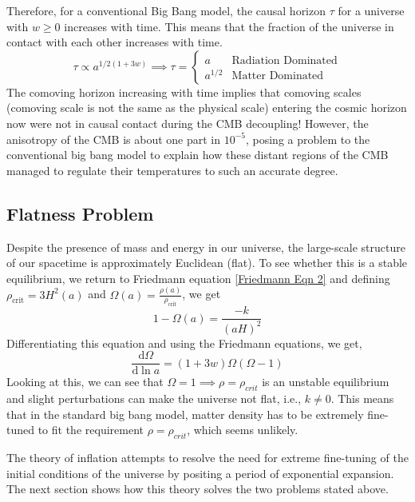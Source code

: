\documentclass[aps,prd,reprint,preprintnumbers,showpacs,floatfix,nofootinbib,superscript address]{revtex4-2}
\begin{document}
Therefore, for a conventional Big Bang model, the causal horizon $\tau$ for a universe with $w \geq 0$ increases with time. This means that the fraction of the universe in contact with each other increases with time.
\begin{equation}
    \tau \propto a^{1/2(1+3w)} \implies \tau = \begin{cases}
        a & \text{Radiation Dominated} \\
        a^{1/2} & \text{Matter Dominated}
    \end{cases}
\end{equation}
The comoving horizon increasing with time implies that comoving scales (comoving scale is not the same as the physical scale) entering the cosmic horizon now were not in causal contact during the CMB decoupling! However, the anisotropy of the CMB is about one part in $10^{-5}$, posing a problem to the conventional big bang model to explain how these distant regions of the CMB managed to regulate their temperatures to such an accurate degree.

\subsection{Flatness Problem} \label{Flatness Problem}
Despite the presence of mass and energy in our universe, the large-scale structure of our spacetime is approximately Euclidean (flat). To see whether this is a stable equilibrium, we return to Friedmann equation \cref{Friedmann Eqn 2} and defining $\rho_{\text{crit}} = 3H^2(a)$ and $\Omega(a) = \frac{\rho(a)}{\rho_{\text{crit}}}$, we get
\begin{equation}
    1 - \Omega(a) = \frac{-k}{(aH)^2}
\end{equation}
Differentiating this equation and using the Friedmann equations, we get,
\begin{equation}
    \frac{\mathrm{d}\Omega}{\mathrm{d} \ln a} = (1+3w)\Omega(\Omega-1)
\end{equation}
Looking at this, we can see that $\Omega = 1  \implies \rho = \rho_{crit}$ is an unstable equilibrium and slight perturbations can make the universe not flat, i.e., $k \neq 0$. This means that in the standard big bang model, matter density has to be extremely fine-tuned to fit the requirement $\rho = \rho_{crit}$, which seems unlikely.

The theory of inflation attempts to resolve the need for extreme fine-tuning of the initial conditions of the universe by positing a period of exponential expansion. The next section shows how this theory solves the two problems stated above.
\end{document}
